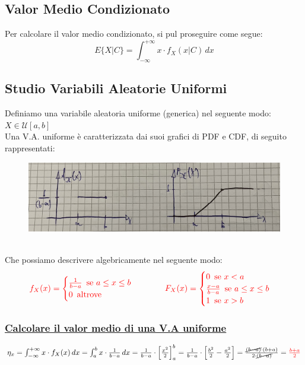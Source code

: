 \documentclass{article}
\begin{document}
\subsection{Valor Medio Condizionato}
Per calcolare il valor medio condizionato, si pul proseguire come segue:
\[E \big\{ X | C \big\} = \int_{-\infty}^{+\infty} x \cdot f_X(x|C) \,dx\]

\subsection{Studio Variabili Aleatorie Uniformi}
Definiamo una variabile aleatoria uniforme (generica) nel seguente modo: $X \in \mathcal{U}[a,b]$ \\
Una V.A. uniforme è caratterizzata dai suoi grafici di PDF e CDF, di seguito rappresentati:
\begin{figure}[ht]
\centering
\includegraphics[scale=0.12]{images/60.V.A.Unif.jpeg}
\end{figure} ~\\
Che possiamo descrivere algebricamente nel seguente modo: 
\[\color{red}
\begin{matrix}
f_X(x) = \begin{cases}
\frac{1}{b-a} \,\text{ se } a \leq x \leq b \\
0 \,\text{ altrove}
\end{cases}
&&&
F_X(x) = \begin{cases}
0 \,\text{ se } x < a \\
\frac{x-a}{b-a} \,\text{ se } a \leq x \leq b \\
1 \,\text{ se } x>b
\end{cases}
\end{matrix}\]
\subsubsection{\underline{Calcolare il valor medio di una V.A uniforme}}
$\eta_x = \int_{-\infty}^{+\infty} x \cdot f_X(x) \,dx = \int_{a}^{b} x \cdot \frac{1}{b-a} \,dx = \frac{1}{b-a} \cdot \left[\frac{x^2}{2}\right]_a^b = \frac{1}{b-a} \cdot \left[\frac{b^2}{2} - \frac{a^2}{2}\right] = \frac{\cancel{(b-a)} \cdot (b+a) }{ 2 \cdot \cancel{(b-a)}} = \color{red}\frac{b+a}{2}$
\end{document}
